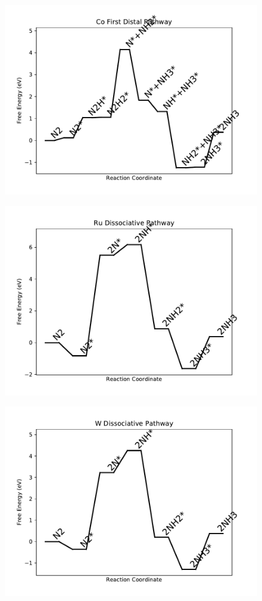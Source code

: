 \begin{figure}
\centering
\includegraphics[width=0.8\linewidth]{data/plots/Co_distal_1.pdf}
\end{figure}

\begin{figure}
\centering
\includegraphics[width=0.8\linewidth]{data/plots/Ru_dissociative.pdf}
\end{figure}

\begin{figure}
\centering
\includegraphics[width=0.8\linewidth]{data/plots/W_dissociative.pdf}
\end{figure}

